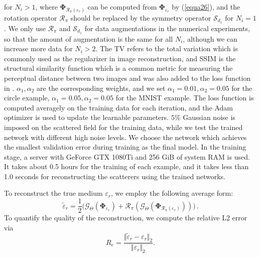 \documentclass{article}
\newcommand{\fn}[1]{\footnote{ {\color{blue}{#1}} }}
\begin{document}
for $N_i>1$, where $\mathbf{\Phi}_{\mathcal{R}_{\pi}(\varepsilon_{r})}$ can be computed from $\mathbf{\Phi}_{\varepsilon_{r}}$ by (\ref{equa26}), and the rotation operator $\mathcal{R}_\pi$ should be replaced by the symmetry operator $\mathcal{S}_{d_1}$ for $N_i=1$. We only use $\mathcal{R}_\pi$ and $\mathcal{S}_{d_1}$ for data augmentations in the numerical experiments, so that the amount of augmentation is the same for all $N_i$, although we can increase more data for $N_i>2$. The TV refers to the total variation which is commonly used as the regularizer in image reconstruction, and SSIM \cite{wang2003multiscale} is the structural similarity function which is a common metric for measuring the perceptual distance between two images and was also added to the loss function in \cite{huang2020deep}. $\alpha_{1},\alpha_{2}$ are the corresponding weights, and we set $\alpha_{1}=0.01, \alpha_{2}=0.05$ for the circle example, $\alpha_{1}=0.05, \alpha_{2}=0.05$ for the MNIST example. The loss function is computed averagely on the training data for each iteration, and the Adam optimizer is used to update the learnable parameters. $5\%$ Gaussian noise is imposed on the scattered field for the training data, while we test the trained network with different high noise levels. We choose the network which achieves the smallest validation error during training as the final model. In the training stage, a server with GeForce GTX 1080Ti and 256 GiB of system RAM is used. It takes about 0.5 hours for the training of each example, and it takes less than 1.0 seconds for reconstructing the scatterers using the trained networks. 
    
    To reconstruct the true medium $\varepsilon_r$, we employ the following average form:
    \begin{equation}
    	\tilde{\varepsilon}_{r}=\frac{1}{2}\bigg(\mathcal{G}_\Theta(\mathbf{\Phi}_{\varepsilon_{r}})+\mathcal{R}_{\pi}(\mathcal{G}_\Theta(\mathbf{\Phi}_{\mathcal{R}_{\pi}(\varepsilon_{r})}))\bigg)\,.
    \end{equation} 
    To quantify the quality of the reconstruction, we compute the relative L2 error via
    \begin{equation}
    	R_{e} = \frac{\Vert\tilde{\varepsilon}_{r}-\varepsilon_{r} \Vert_2}{\Vert \varepsilon_{r}\Vert_2}.
    \end{equation}
	
\end{document}

